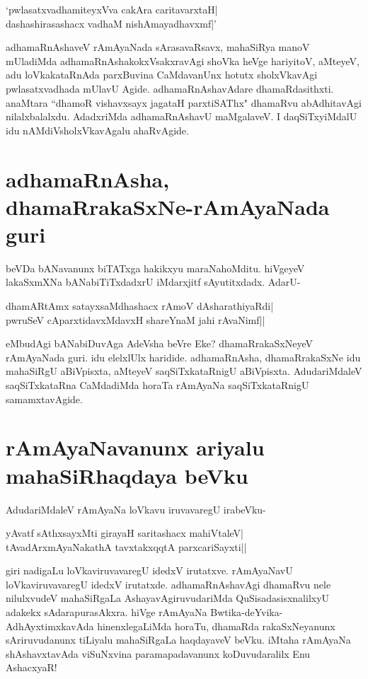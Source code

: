\begin{shloka} 
`pwlasatxvadhamiteyxVva cakAra caritavarxtaH|\label{207c}\\ 
dashashirasashacx vadhaM nishAmayadhavxmf|'\label{207}
\end{shloka}

adhamaRnAshaveV rAmAyaNada sArasavaRsavx, mahaSiRya manoV mUladiMda adhamaRnAshakokxVsakxravAgi shoVka heVge hariyitoV, aMteyeV, adu loVkakataRnAda parxBuvina CaMdavanUnx hotutx sholxVkavAgi pwlasatxvadhada mUlavU Agide. adhamaRnAshavAdare dhamaRdasithxti. anaMtara ``dhamoR vishavxsayx jagataH parxtiSAThx"\label{207b} dhamaRvu abAdhitavAgi nilalxbalalxdu. AdadxriMda adhamaRnAshavU maMgalaveV. I daqSiTxyiMdalU idu nAMdiVsholxVkavAgalu ahaRvAgide. 

\section*{adhamaRnAsha, dhamaRrakaSxNe-rAmAyaNada guri} 

beVDa bANavanunx biTATxga hakikxyu maraNahoMditu. hiVgeyeV lakaSxmXNa bANabiTiTxdadxrU iMdarxjitf sAyutitxdadx. AdarU- 


\begin{shloka}
dhamARtAmx satayxsaMdhashacx rAmoV dAsharathiyaRdi|\label{207a}\\ 
pwruSeV cAparxtidavxMdavxH shareYnaM ja{hi} rAvaNimf||
\end{shloka}

eMbudAgi bANabiDuvAga AdeVsha beVre Eke? dhamaRrakaSxNeyeV rAmAyaNada guri. idu elelxlUlx haridide. adhamaRnAsha, dhamaRrakaSxNe idu mahaSiRgU aBiVpisxta, aMteyeV saqSiTxkataRnigU aBiVpisxta. AdudariMdaleV saqSiTxkataRna CaMdadiMda horaTa rAmAyaNa saqSiTxkataRnigU samamxtavAgide. 

\section*{rAmAyaNavanunx ariyalu mahaSiRhaqdaya beVku} 

AdudariMdaleV rAmAyaNa loVkavu iruvavaregU irabeVku- 

\begin{shloka} 
yAvatf sAthxsayxMti girayaH saritashacx mahiVtaleV|\label{208b}\\ 
tAvadArxmAyaNakathA tavxtakxqqtA parxcariSayxti||
\end{shloka}

giri nadigaLu loVkaviruvavaregU idedxV irutatxve. rAmAyaNavU loVkaviruvavaregU idedxV irutatxde. adhamaRnAshavAgi dhamaRvu nele nilulxvudeV mahaSiRgaLa AshayavAgiruvudariMda QuSisadasisxnalilxyU adakekx sAdarapurasAkxra. hiVge rAmAyaNa Bwtika-deYvika-AdhAyxtimxkavAda hinenxlegaLiMda horaTu, dhamaRda rakaSxNeyanunx sAriruvudanunx tiLiyalu mahaSiRgaLa haqdayaveV beVku. iMtaha rAmAyaNa shAshavxtavAda viSuNxvina paramapadavanunx koDuvudaralilx Enu AshacxyaR! 

